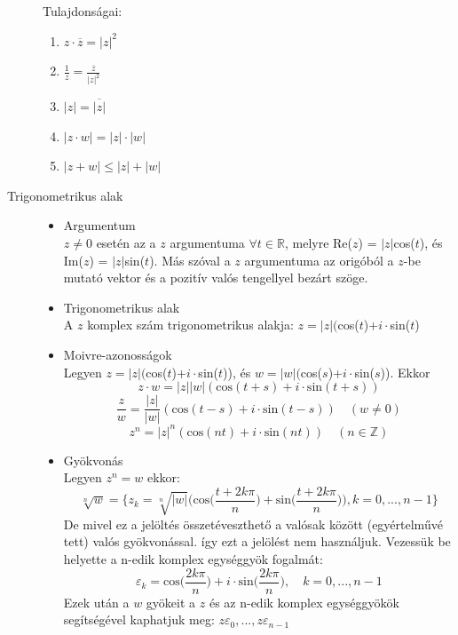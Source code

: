 \documentclass[margin=0px]{article}
\newcommand{\Z}{\mathbb{Z}}
\newcommand{\R}{\mathbb{R}}
\begin{document}
\begin{description}
						Tulajdonságai:
						\begin{enumerate}
							\item $z\cdot\overline{z} = {|z|}^2$
							\item $\frac{1}{z}= \frac{\overline{z}}{|z|^2} $
							\item $|z| = \overline{|z|}$
							\item $|z\cdot w | = |z|\cdot|w|$
							\item $|z+w| \leq |z| +|w|$
						\end{enumerate}
					\item[Trigonometrikus alak] \hfill
						\begin{itemize}
							\item Argumentum \\
								$z \neq 0$ esetén az a $z$ argumentuma $\forall t \in\R$, melyre Re($z$) = $|z|$cos($t$), és Im($z$) = $|z|$sin($t$). Más szóval a $z$ argumentuma az origóból a $z$-be mutató vektor és a pozitív valós tengellyel bezárt szöge.
							\item Trigonometrikus alak \\
								A $z$ komplex szám trigonometrikus alakja: $ z = |z|($cos($t$)+$i\cdot$sin($t$)
							\item Moivre-azonosságok \\
								Legyen $z = |z|($cos($t$)+$i\cdot$sin($t$)), és $w = |w|($cos($s$)+$i\cdot$sin($s$)). Ekkor
								\[z\cdot w = |z||w|(\textrm{cos}(t+s)+i\cdot \textrm{sin}(t+s))\]
								\[\frac{z}{w} = \frac{|z|}{|w|}(\textrm{cos}(t-s)+i\cdot \textrm{sin}(t-s)) \quad (w \neq 0)\]
								\[ z^n = |z|^n(\textrm{cos}(nt)+i\cdot \textrm{sin}(nt)) \quad (n \in \Z)\]
							\item Gyökvonás \\
								Legyen $z^n = w$ ekkor:
								\[ \sqrt[n]{w} = \Bigg\{z_k = \sqrt[n]{|w|}\bigg(\textrm{cos}\Big(\frac{t+2k\pi}{n}\Big)+\textrm{sin}\Big(\frac{t+2k\pi}{n}\Big)\bigg), k=0,...,n-1\Bigg\} \]
								De mivel ez a jelöltés összetéveszthető a valósak között (egyértelművé tett) valós gyökvonással. így ezt a jelölést nem használjuk. Vezessük be helyette a n-edik komplex egységgyök fogalmát:
								\[\varepsilon_k = \textrm{cos}\bigg(\frac{2k\pi}{n}\bigg)+i\cdot\textrm{sin}\bigg(\frac{2k\pi}{n}\bigg), \quad k=0,...,n-1\]
								Ezek után a $w$ gyökeit a $z$ és az n-edik komplex egységgyökök segítségével kaphatjuk meg: $z\varepsilon_0, ..., z\varepsilon_{n-1}$ 
						\end{itemize}
					
				\end{description}
\end{document}

